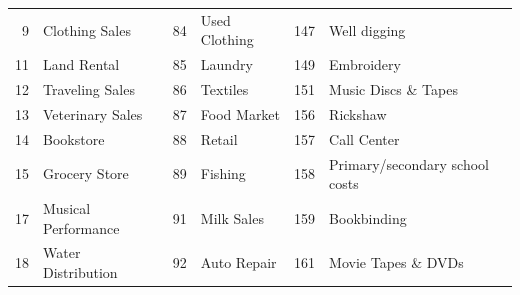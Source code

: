 \begin{longtable}[]{|r|l|r|l|r|l|}
    \hline \hline
    \endlastfoot


    9                                 & Clothing Sales                     & 84                                & Used Clothing                      & 147                               & Well digging                       \\
    11                                & Land Rental                        & 85                                & Laundry                            & 149                               & Embroidery                         \\
    12                                & Traveling Sales                    & 86                                & Textiles                           & 151                               & Music Discs \& Tapes               \\
    13                                & Veterinary Sales                   & 87                                & Food Market                        & 156                               & Rickshaw                           \\
    14                                & Bookstore                          & 88                                & Retail                             & 157                               & Call Center                        \\
    15                                & Grocery Store                      & 89                                & Fishing                            & 158                               & Primary/secondary school
    costs                                                                                                                                                                                                                    \\
    17                                & Musical Performance                & 91                                & Milk Sales                         & 159                               & Bookbinding                        \\
    18                                & Water Distribution                 & 92                                & Auto Repair                        & 161                               & Movie Tapes \&
    DVDs                                                                                                                                                                                                                     \\

\end{longtable}
